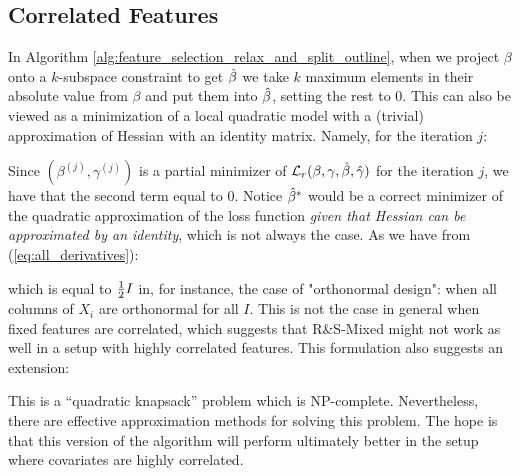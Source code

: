 \documentclass[11pt,letterpaper]{article}
\newcommand{\ouralgo}{R\&S-Mixed }
\numberwithin{equation}{section} %
\numberwithin{figure}{section} %
\numberwithin{table}{section} %
\begin{document}
\subsection{Correlated Features}
In Algorithm \ref{alg:feature_selection_relax_and_split_outline}, when we project $\beta$ onto a $k$-subspace constraint to get $\hat\beta$ we take $k$ maximum elements in their absolute value from $\beta$ and put them into $\hat\beta$, setting the rest to $0$. This can also be viewed as a minimization of a local quadratic model with a (trivial) approximation of Hessian with an identity matrix. Namely, for the iteration $j$:

Since  $(\beta^{(j)}, \gamma^{(j)})$ is a partial minimizer of $\operatorname{\mathcal{L}}_r(\beta, \gamma, \hat\beta, \hat\gamma)$ for the iteration $j$, we have that the second term equal to $0$. Notice $\hat\beta^*$ would be a correct minimizer of the quadratic approximation of the loss function \textit{given that Hessian can be approximated by an identity}, which is not always the case. As we have from (\ref{eq:all_derivatives}):

which is equal to $\frac{1}{2} I$ in, for instance, the case of "orthonormal design": when all columns of $X_i$ are orthonormal for all $I$. This is not the case in general when fixed features are correlated, which suggests that \ouralgo might not work as well in a setup with highly correlated features. This formulation also suggests an extension:

This is a ``quadratic knapsack'' problem which is NP-complete. Nevertheless, there are effective approximation methods for solving this problem. The hope is that this version of the algorithm will perform ultimately better in the setup where covariates are highly correlated.



\clearpage
\end{document}
